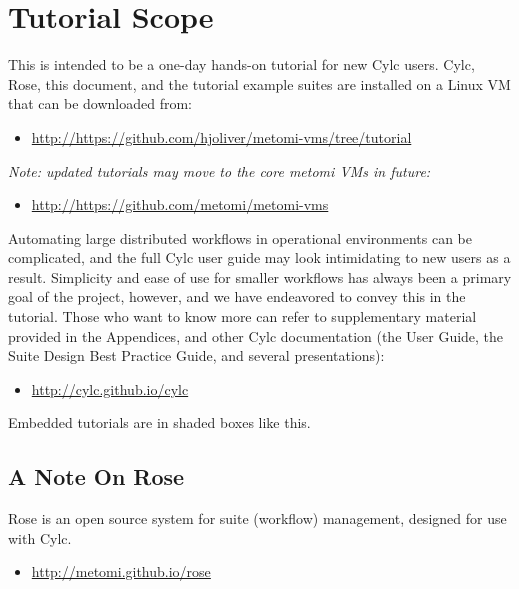 \section{Tutorial Scope}

This is intended to be a one-day hands-on tutorial for new Cylc users. Cylc,
Rose, this document, and the tutorial example suites are installed on a
Linux VM that can be downloaded from:
\begin{itemize}
    \item \url{http://https://github.com/hjoliver/metomi-vms/tree/tutorial}
\end{itemize}

{\em Note: updated tutorials may move to the core metomi VMs in future:}
\begin{itemize}
    \item \url{http://https://github.com/metomi/metomi-vms}
\end{itemize}

Automating large distributed workflows in operational environments can be
complicated, and the full Cylc user guide may look intimidating to new users as
a result. Simplicity and ease of use for smaller workflows has always been a
primary goal of the project, however, and we have endeavored to convey this in
the tutorial. Those who want to know more can refer to supplementary material
provided in the Appendices, and other Cylc documentation (the User Guide, the
Suite Design Best Practice Guide, and several presentations):

\begin{itemize}
    \item \url{http://cylc.github.io/cylc}
\end{itemize}



\begin{shaded*}
Embedded tutorials are in shaded boxes like this.
\end{shaded*}

\subsection{A Note On Rose}

Rose is an open source system for suite (workflow) management, designed for use
with Cylc.
\begin{itemize}
     \item \url{http://metomi.github.io/rose}
\end{itemize}
 
